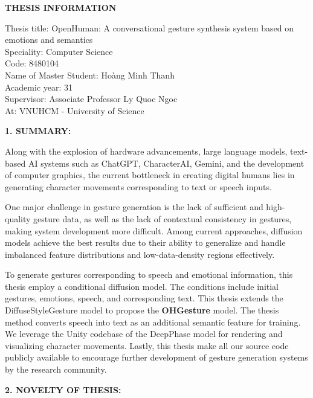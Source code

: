 
\pagebreak
{}
{}
\begin{center}
	{\centering \MakeUppercase \LARGE \fontsize{16.16}{19.26}\selectfont \bfseries THESIS INFORMATION}
\end{center}



{
	\setlength{\parindent}{0pt}
Thesis title: OpenHuman: A conversational gesture synthesis system based on emotions and semantics \\
Speciality: Computer Science \\
Code: 8480104\\
Name of Master Student: Hoàng Minh Thanh \\
Academic year: 31\\
Supervisor: Associate Professor Ly Quoc Ngoc\\
At: VNUHCM - University of Science}


\vspace{5pt}
{\MakeUppercase\Large \bfseries{1. SUMMARY:}}

Along with the explosion of hardware advancements, large language models, text-based AI systems such as ChatGPT, CharacterAI, Gemini, and the development of computer graphics, the current bottleneck in creating digital humans lies in generating character movements corresponding to text or speech inputs.

One major challenge in gesture generation is the lack of sufficient and high-quality gesture data, as well as the lack of contextual consistency in gestures, making system development more difficult. Among current approaches, diffusion models achieve the best results due to their ability to generalize and handle imbalanced feature distributions and low-data-density regions effectively.

To generate gestures corresponding to speech and emotional information, this thesis employ a conditional diffusion model. The conditions include initial gestures, emotions, speech, and corresponding text. This thesis extends the DiffuseStyleGesture model to propose the \textbf{OHGesture} model. The thesis method converts speech into text as an additional semantic feature for training. We leverage the Unity codebase of the DeepPhase model for rendering and visualizing character movements. Lastly, this thesis make all our source code publicly available to encourage further development of gesture generation systems by the research community.


\vspace{5pt}
{\MakeUppercase\Large \bfseries 2. NOVELTY OF THESIS:}


